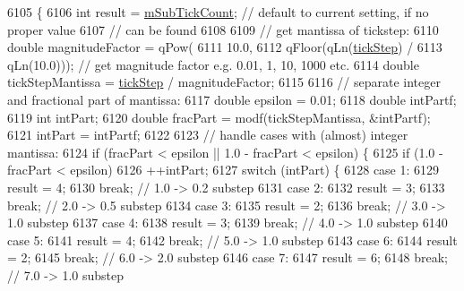\begin{DoxyCode}
6105                                                             \{
6106   \textcolor{keywordtype}{int} result = \hyperlink{class_q_c_p_axis_ad70198e6ae2801fc409bc3caec707da9}{mSubTickCount}; \textcolor{comment}{// default to current setting, if no proper value}
6107                               \textcolor{comment}{// can be found}
6108 
6109   \textcolor{comment}{// get mantissa of tickstep:}
6110   \textcolor{keywordtype}{double} magnitudeFactor = qPow(
6111       10.0,
6112       qFloor(qLn(\hyperlink{class_q_c_p_axis_a0e6120d24266544441ab691f316a1b03}{tickStep}) /
6113              qLn(10.0))); \textcolor{comment}{// get magnitude factor e.g. 0.01, 1, 10, 1000 etc.}
6114   \textcolor{keywordtype}{double} tickStepMantissa = \hyperlink{class_q_c_p_axis_a0e6120d24266544441ab691f316a1b03}{tickStep} / magnitudeFactor;
6115 
6116   \textcolor{comment}{// separate integer and fractional part of mantissa:}
6117   \textcolor{keywordtype}{double} epsilon = 0.01;
6118   \textcolor{keywordtype}{double} intPartf;
6119   \textcolor{keywordtype}{int} intPart;
6120   \textcolor{keywordtype}{double} fracPart = modf(tickStepMantissa, &intPartf);
6121   intPart = intPartf;
6122 
6123   \textcolor{comment}{// handle cases with (almost) integer mantissa:}
6124   \textcolor{keywordflow}{if} (fracPart < epsilon || 1.0 - fracPart < epsilon) \{
6125     \textcolor{keywordflow}{if} (1.0 - fracPart < epsilon)
6126       ++intPart;
6127     \textcolor{keywordflow}{switch} (intPart) \{
6128     \textcolor{keywordflow}{case} 1:
6129       result = 4;
6130       \textcolor{keywordflow}{break}; \textcolor{comment}{// 1.0 -> 0.2 substep}
6131     \textcolor{keywordflow}{case} 2:
6132       result = 3;
6133       \textcolor{keywordflow}{break}; \textcolor{comment}{// 2.0 -> 0.5 substep}
6134     \textcolor{keywordflow}{case} 3:
6135       result = 2;
6136       \textcolor{keywordflow}{break}; \textcolor{comment}{// 3.0 -> 1.0 substep}
6137     \textcolor{keywordflow}{case} 4:
6138       result = 3;
6139       \textcolor{keywordflow}{break}; \textcolor{comment}{// 4.0 -> 1.0 substep}
6140     \textcolor{keywordflow}{case} 5:
6141       result = 4;
6142       \textcolor{keywordflow}{break}; \textcolor{comment}{// 5.0 -> 1.0 substep}
6143     \textcolor{keywordflow}{case} 6:
6144       result = 2;
6145       \textcolor{keywordflow}{break}; \textcolor{comment}{// 6.0 -> 2.0 substep}
6146     \textcolor{keywordflow}{case} 7:
6147       result = 6;
6148       \textcolor{keywordflow}{break}; \textcolor{comment}{// 7.0 -> 1.0 substep}

\end{DoxyCode}
